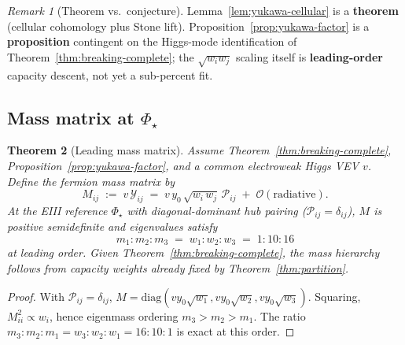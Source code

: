\documentclass[11pt]{article}
\theoremstyle{plain}
\newtheorem{theorem}{Theorem}[section]
\theoremstyle{definition}
\theoremstyle{remark}
\newtheorem{remark}[theorem]{Remark}
\numberwithin{equation}{section}
\newcommand{\orderparam}{\Phi}
\begin{document}
\begin{remark}[Theorem vs.\ conjecture]
Lemma~\ref{lem:yukawa-cellular} is a \textbf{theorem} (cellular cohomology
plus Stone lift). Proposition~\ref{prop:yukawa-factor} is a
\textbf{proposition} contingent on the Higgs-mode identification of
Theorem~\ref{thm:breaking-complete}; the $\sqrt{w_i w_j}$ scaling itself is
\textbf{leading-order} capacity descent, not yet a sub-percent fit.
\end{remark}

\subsection{Mass matrix at $\orderparam_\star$}
\label{sec:yukawa:mass-matrix}

\begin{theorem}[Leading mass matrix]\label{thm:yukawa-mass}
Assume Theorem~\ref{thm:breaking-complete}, Proposition~\ref{prop:yukawa-factor},
and a common electroweak Higgs VEV $v$. Define the fermion mass matrix by
\begin{equation}\label{eq:mass-matrix-def}
  M_{ij}
  \;:=\;
  v\,\mathcal{Y}_{ij}
  \;=\;
  v\,y_0\,\sqrt{w_i\,w_j}\,\mathcal{P}_{ij}
  \;+\;\mathcal{O}(\text{radiative}).
\end{equation}
At the EIII reference $\orderparam_\star$ with diagonal-dominant hub pairing
($\mathcal{P}_{ij}=\delta_{ij}$), $M$ is positive semidefinite and
eigenvalues satisfy
\begin{equation}\label{eq:mass-eigenvalues}
  m_1:m_2:m_3 \;=\; w_1:w_2:w_3 \;=\; 1:10:16
\end{equation}
at leading order. Given Theorem~\ref{thm:breaking-complete}, the mass hierarchy
follows from capacity weights already fixed by Theorem~\ref{thm:partition}.
\end{theorem}

\begin{proof}
With $\mathcal{P}_{ij}=\delta_{ij}$, $M=\mathrm{diag}(v y_0\sqrt{w_1},
v y_0\sqrt{w_2}, v y_0\sqrt{w_3})$. Squaring,
$M_{ii}^2\propto w_i$, hence eigenmass ordering $m_3>m_2>m_1$. The ratio
$m_3:m_2:m_1=w_3:w_2:w_1=16:10:1$ is exact at this order.
\end{proof}
\end{document}

